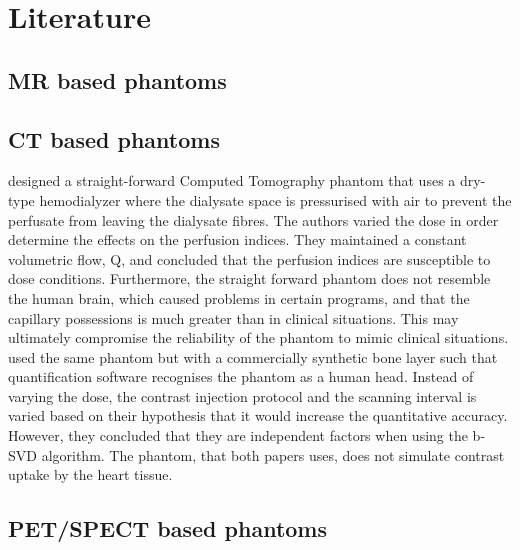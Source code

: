 \chapter{Literature}
\label{ch:literature}

\section{MR based phantoms}
\section{CT based phantoms}
\cite{suzuki2017quantitative} designed a straight-forward Computed Tomography phantom that uses a dry-type hemodialyzer where the dialysate space is pressurised with air to prevent the perfusate from leaving the dialysate fibres. The authors varied the dose in order determine the effects on the perfusion indices. They maintained a constant volumetric flow, Q, and concluded that the perfusion indices are susceptible to dose conditions. Furthermore, the straight forward phantom does not resemble the human brain, which caused problems in certain programs, and that the capillary possessions is much greater than in clinical situations. This may ultimately compromise the reliability of the phantom to mimic clinical situations. \cite{hashimoto2018effect} used the same phantom but with a commercially synthetic bone layer such that quantification software recognises the phantom as a human head. Instead of varying the dose, the contrast injection protocol and the scanning interval is varied based on their hypothesis that it would increase the quantitative accuracy. However, they concluded that they are independent factors when using the b-SVD algorithm. The phantom, that both papers uses, does not simulate contrast uptake by the heart tissue.
\section{PET/SPECT based phantoms}
